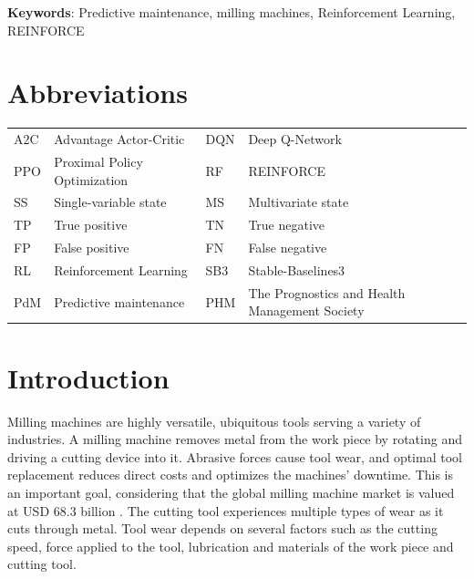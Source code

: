 \documentclass[a4paper, 12pt]{article}
\newcommand{\rowspace}[1]{\renewcommand{\arraystretch}{#1}}
\begin{document}
\noindent \textbf{Keywords}: Predictive maintenance, milling machines, Reinforcement Learning, REINFORCE
\section*{Abbreviations}

\begin{table}[!htbp]\centering
	\sffamily
	\rowspace{1.3}
	\begin{tabular}{L{1cm} L{4.5cm} L{1cm} L{4.5cm}}
		\toprule
		A2C & Advantage Actor-Critic & DQN & Deep Q-Network\\
		PPO & Proximal Policy Optimization & RF & REINFORCE\\
		SS  & Single-variable state & MS & Multivariate state\\
		TP  & True positive &TN &True negative\\
		FP  & False positive &FN &False negative\\
		RL  & Reinforcement Learning & SB3 & Stable-Baselines3\\
		PdM & Predictive maintenance & PHM & The Prognostics and Health Management Society\\
		\bottomrule
	\end{tabular}
	\label{tbl:abbrev}
\end{table}

\newpage
\thispagestyle{empty}
\section{Introduction}


Milling machines are highly versatile, ubiquitous tools serving a variety of industries. A milling machine removes metal from the work piece by rotating and driving a cutting device into it. Abrasive forces cause tool wear, and optimal tool replacement reduces direct costs and optimizes the machines' downtime. This is an important goal, considering that the global milling machine market is valued at USD 68.3 billion \citep{milling-market}. The cutting tool experiences multiple types of wear as it cuts through metal. Tool wear depends on several factors such as the cutting speed, force applied to the tool, lubrication and materials of the work piece and cutting tool. 
\end{document}
